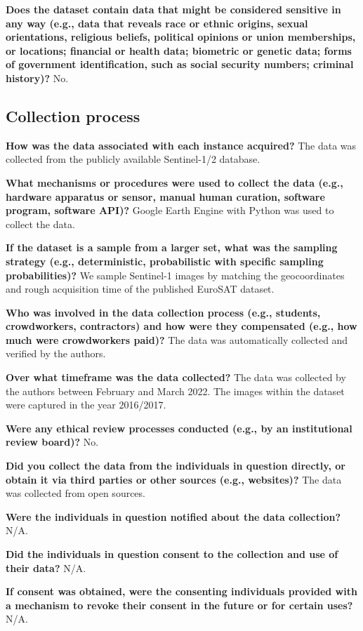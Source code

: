 \documentclass[lettersize,journal]{IEEEtran}
\begin{document}
\textbf{Does the dataset contain data that might be considered sensitive in any way (e.g., data that reveals race or ethnic origins, sexual orientations, religious beliefs, political opinions or union memberships, or
locations; financial or health data; biometric or genetic data; forms of government identification, such as social security numbers; criminal history)?} No.

\subsection{Collection process}

\textbf{How was the data associated with each instance acquired?} The data was collected from the publicly available Sentinel-1/2 database. 

\textbf{What mechanisms or procedures were used to collect the data (e.g., hardware apparatus or
sensor, manual human curation, software program, software API)?} Google Earth Engine with Python was used to collect the data.

\textbf{If the dataset is a sample from a larger set, what was the sampling strategy (e.g., deterministic, probabilistic with specific sampling probabilities)?} We sample Sentinel-1 images by matching the geocoordinates and rough acquisition time of the published EuroSAT dataset.

\textbf{Who was involved in the data collection process (e.g., students, crowdworkers, contractors) and how were they compensated (e.g., how much were crowdworkers paid)?} The data was automatically collected and verified by the authors.

\textbf{Over what timeframe was the data collected?} The data was collected by the authors between February and March 2022. The images within the dataset were captured in the year 2016/2017.

\textbf{Were any ethical review processes conducted (e.g., by an institutional review board)?} No.

\textbf{Did you collect the data from the individuals in question directly, or obtain it via third parties or other sources (e.g., websites)?} The data was collected from open sources.

\textbf{Were the individuals in question notified about the data collection?} N/A.

\textbf{Did the individuals in question consent to the collection and use of their data?} N/A.

\textbf{If consent was obtained, were the consenting individuals provided with a mechanism to revoke their consent in the future or for certain uses?} N/A.
\end{document}

